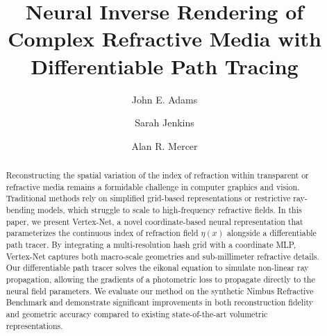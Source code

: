 \documentclass[acmtog,anonymous,review]{acmart}
\begin{document}
\title{Neural Inverse Rendering of Complex Refractive Media with Differentiable Path
Tracing}

\author{John E. Adams}

\author{Sarah Jenkins}

\author{Alan R. Mercer}

\renewcommand{\shortauthors}{Adams et al.}

\begin{abstract}
Reconstructing the spatial variation of the index of refraction within transparent or
refractive media remains a formidable challenge in computer graphics and vision. Traditional
methods rely on simplified grid-based representations or restrictive ray-bending models,
which struggle to scale to high-frequency refractive fields. In this paper, we present
Vertex-Net, a novel coordinate-based neural representation that parameterizes the
continuous index of refraction field $\eta(x)$ alongside a differentiable path tracer. By
integrating a multi-resolution hash grid with a coordinate MLP, Vertex-Net captures both
macro-scale geometries and sub-millimeter refractive details. Our differentiable path tracer
solves the eikonal equation to simulate non-linear ray propagation, allowing the gradients
of a photometric loss to propagate directly to the neural field parameters. We evaluate our
method on the synthetic Nimbus Refractive Benchmark and demonstrate significant improvements
in both reconstruction fidelity and geometric accuracy compared to existing
state-of-the-art volumetric representations.
\end{abstract}



\maketitle
\end{document}
